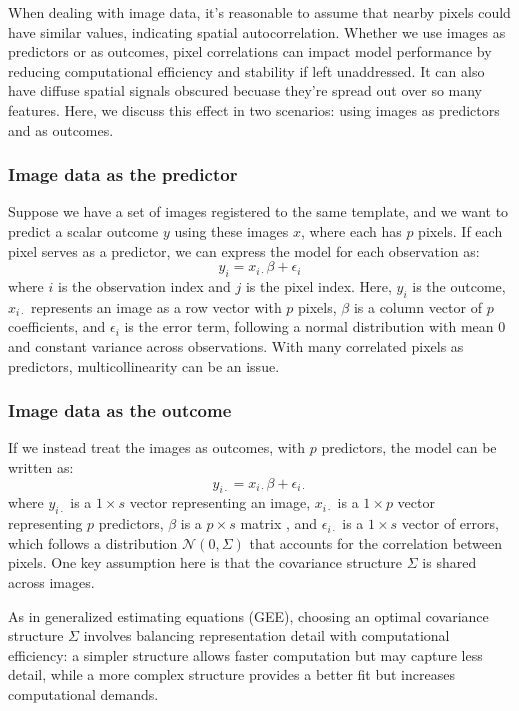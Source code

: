 \documentclass[12pt]{article}
\begin{document}
When dealing with image data, it's reasonable to assume that nearby pixels could have similar values, indicating spatial autocorrelation. Whether we use images as predictors or as outcomes, pixel correlations can impact model performance by reducing computational efficiency and stability if left unaddressed. It can also have diffuse spatial signals obscured becuase they're spread out over so many features. Here, we discuss this effect in two scenarios: using images as predictors and as outcomes.

\subsubsection*{Image data as the predictor}

Suppose we have a set of images registered to the same template, and we want to predict a scalar outcome \( y \) using these images \( x \), where each has \( p \) pixels. If each pixel serves as a predictor, we can express the model for each observation as:
\[
  y_i = x_{i \cdot} \beta + \epsilon_i
\]
where \( i \) is the observation index and \( j \) is the pixel index. Here, \( y_i \) is the outcome, \( x_{i \cdot} \) represents an image as a row vector with \( p \) pixels, \( \beta \) is a column vector of \( p \) coefficients, and \( \epsilon_i \) is the error term, following a normal distribution with mean 0 and constant variance across observations. With many correlated pixels as predictors, multicollinearity can be an issue.

\subsubsection*{Image data as the outcome}

If we instead treat the images as outcomes, with \( p \) predictors, the model can be written as:
\[
  y_{i \cdot} = x_{i \cdot} \beta + \epsilon_{i \cdot}
\]
where \( y_{i \cdot} \) is a \( 1 \times s \) vector representing an image, \( x_{i \cdot} \) is a \( 1 \times p \) vector representing \( p \) predictors, \( \beta \) is a \( p \times s \) matrix , and \( \epsilon_{i \cdot} \) is a \( 1 \times s \) vector of errors, which follows a distribution \( \mathcal{N}(0, \Sigma) \) that accounts for the correlation between pixels. One key assumption here is that the covariance structure \( \Sigma \) is shared across images.

As in generalized estimating equations (GEE), choosing an optimal covariance structure \( \Sigma \) involves balancing representation detail with computational efficiency: a simpler structure allows faster computation but may capture less detail, while a more complex structure provides a better fit but increases computational demands.
\end{document}
